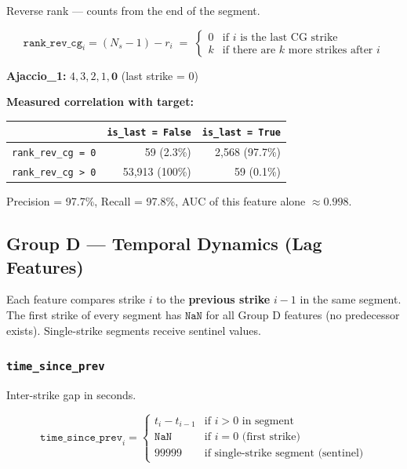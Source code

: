\documentclass[12pt,a4paper]{article}
\newcommand{\feat}[1]{\texttt{\textbf{#1}}}
\begin{document}
Reverse rank --- counts from the end of the segment.

\begin{formulabox}
\[
  \texttt{rank\_rev\_cg}_i = (N_s - 1) - r_i
  \;=\;
  \begin{cases}
    0 & \text{if } i \text{ is the last CG strike} \\
    k & \text{if there are } k \text{ more strikes after } i
  \end{cases}
\]
\end{formulabox}

\textbf{Ajaccio\_1:} $4, 3, 2, 1, \mathbf{0}$ \quad (last strike = 0)

\textbf{Measured correlation with target:}

\begin{center}
\begin{tabular}{lrr}
\toprule
& \texttt{is\_last = False} & \texttt{is\_last = True} \\
\midrule
\texttt{rank\_rev\_cg = 0} & 59 (2.3\%) & 2,568 (97.7\%) \\
\texttt{rank\_rev\_cg > 0} & 53,913 (100\%) & 59 (0.1\%) \\
\bottomrule
\end{tabular}
\end{center}

Precision = 97.7\%, Recall = 97.8\%, AUC of this feature alone $\approx 0.998$.

\vspace{1em}

\subsection{Group D --- Temporal Dynamics (Lag Features)}

Each feature compares strike $i$ to the \textbf{previous strike} $i-1$ in the same segment. The first strike of every segment has $\texttt{NaN}$ for all Group D features (no predecessor exists). Single-strike segments receive sentinel values.

\subsubsection*{\feat{time\_since\_prev}}

Inter-strike gap in seconds.

\begin{formulabox}
\[
  \texttt{time\_since\_prev}_i =
  \begin{cases}
    t_i - t_{i-1} & \text{if } i > 0 \text{ in segment} \\
    \texttt{NaN} & \text{if } i = 0 \text{ (first strike)} \\
    99999 & \text{if single-strike segment (sentinel)}
  \end{cases}
\]
\end{formulabox}
\end{document}
